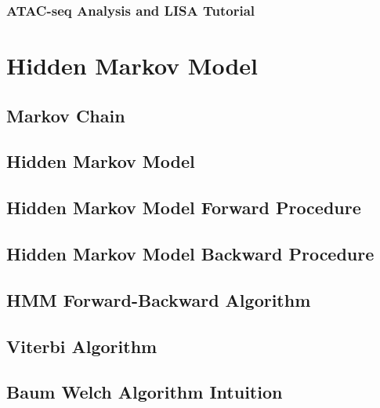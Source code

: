 \documentclass[
]{book}
\begin{document}
\hypertarget{atac-seq-analysis-and-lisa-tutorial}{%
\subsection{ATAC-seq Analysis and LISA Tutorial}\label{atac-seq-analysis-and-lisa-tutorial}}

\hypertarget{hmm}{%
\chapter{Hidden Markov Model}\label{hmm}}

\hypertarget{markov-chain}{%
\section{Markov Chain}\label{markov-chain}}

\hypertarget{hidden-markov-model}{%
\section{Hidden Markov Model}\label{hidden-markov-model}}

\hypertarget{hidden-markov-model-forward-procedure}{%
\section{Hidden Markov Model Forward Procedure}\label{hidden-markov-model-forward-procedure}}

\hypertarget{hidden-markov-model-backward-procedure}{%
\section{Hidden Markov Model Backward Procedure}\label{hidden-markov-model-backward-procedure}}

\hypertarget{hmm-forward-backward-algorithm}{%
\section{HMM Forward-Backward Algorithm}\label{hmm-forward-backward-algorithm}}

\hypertarget{viterbi-algorithm}{%
\section{Viterbi Algorithm}\label{viterbi-algorithm}}

\hypertarget{baum-welch-algorithm-intuition}{%
\section{Baum Welch Algorithm Intuition}\label{baum-welch-algorithm-intuition}}
\end{document}
